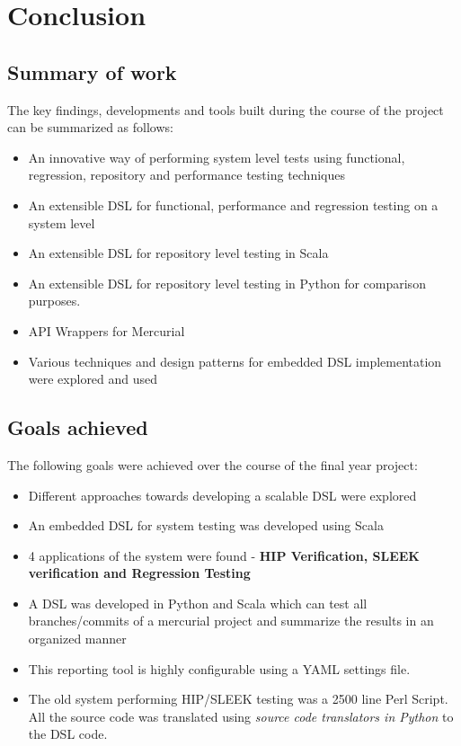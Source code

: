 \section{Conclusion}
\subsection{Summary of work}
The key findings, developments and tools built during the course of the project can be summarized as follows:
\begin{itemize}
\item An innovative way of performing system level tests using functional, regression, repository and performance testing techniques
\item An extensible DSL for functional, performance and regression testing on a system level
\item An extensible DSL for repository level testing in Scala
\item An extensible DSL for repository level testing in Python for comparison purposes.
\item API Wrappers for Mercurial
\item Various techniques and design patterns for embedded DSL implementation were explored and used
\end{itemize}

\subsection{Goals achieved}
The following goals were achieved over the course of the final year project:
\begin{itemize}
\item Different approaches towards developing a scalable DSL were explored
\item An embedded DSL for system testing was developed using Scala
\item 4 applications of the system were found - \textbf{HIP Verification, SLEEK verification and Regression Testing}
\item A DSL was developed in Python and Scala which can test all branches/commits of a mercurial project and summarize the results in an organized manner
\item This reporting tool is highly configurable using a YAML settings file.
\item The old system performing HIP/SLEEK testing was a 2500 line Perl Script. All the source code was translated using \textit{source code translators in Python} to the DSL code.
\end{itemize}

